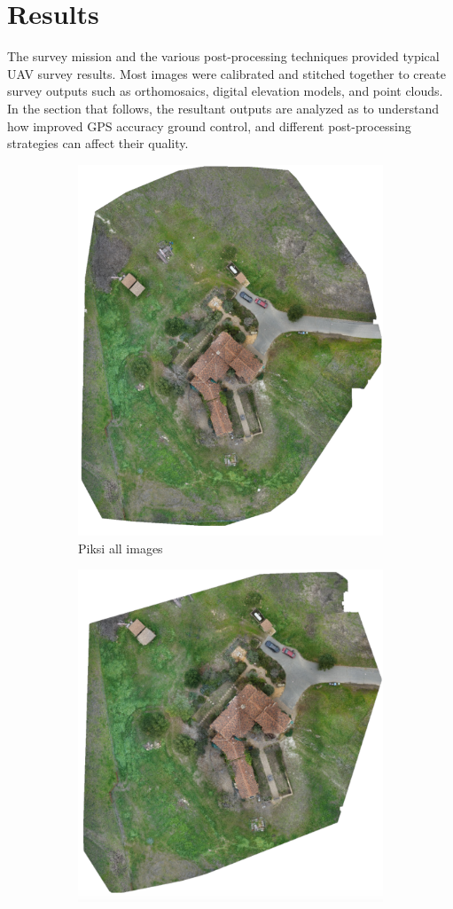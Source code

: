 \documentclass{article}
\begin{document}
\section{Results}
The survey mission and the various post-processing techniques provided typical UAV survey results.  Most images were calibrated and stitched together to create survey outputs such as orthomosaics, digital elevation models, and point clouds.  In the section that follows, the resultant outputs are analyzed as to understand how improved GPS accuracy ground control, and different post-processing strategies can affect their quality.
\begin{figure}
\centering
\renewcommand*\thesubfigure{\arabic{subfigure}}
\begin{subfigure}{.33\textwidth}
  \centering
  \includegraphics[width=.72\linewidth]{images/orthomosaics/p.png}
  \caption{Piksi all images}
  \label{fig:sub1}
\end{subfigure}%
\begin{subfigure}{.33\textwidth}
  \centering
  \includegraphics[width=.72\linewidth]{images/orthomosaics/p_every_other_line.png}

\end{subfigure}
\end{figure}
\end{document}
